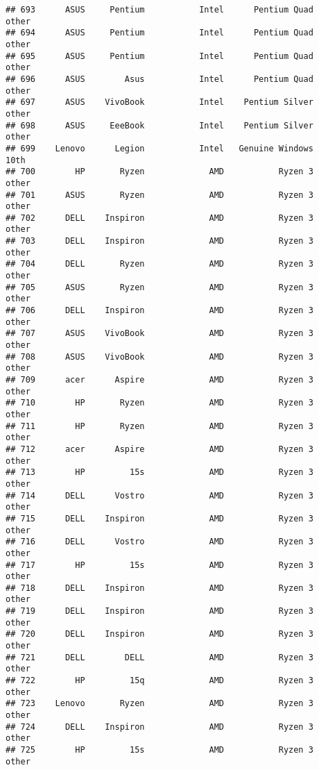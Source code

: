 \documentclass[
]{article}
\begin{document}
\begin{verbatim}
## 693      ASUS     Pentium           Intel      Pentium Quad           other
## 694      ASUS     Pentium           Intel      Pentium Quad           other
## 695      ASUS     Pentium           Intel      Pentium Quad           other
## 696      ASUS        Asus           Intel      Pentium Quad           other
## 697      ASUS    VivoBook           Intel    Pentium Silver           other
## 698      ASUS     EeeBook           Intel    Pentium Silver           other
## 699    Lenovo      Legion           Intel   Genuine Windows            10th
## 700        HP       Ryzen             AMD           Ryzen 3           other
## 701      ASUS       Ryzen             AMD           Ryzen 3           other
## 702      DELL    Inspiron             AMD           Ryzen 3           other
## 703      DELL    Inspiron             AMD           Ryzen 3           other
## 704      DELL       Ryzen             AMD           Ryzen 3           other
## 705      ASUS       Ryzen             AMD           Ryzen 3           other
## 706      DELL    Inspiron             AMD           Ryzen 3           other
## 707      ASUS    VivoBook             AMD           Ryzen 3           other
## 708      ASUS    VivoBook             AMD           Ryzen 3           other
## 709      acer      Aspire             AMD           Ryzen 3           other
## 710        HP       Ryzen             AMD           Ryzen 3           other
## 711        HP       Ryzen             AMD           Ryzen 3           other
## 712      acer      Aspire             AMD           Ryzen 3           other
## 713        HP         15s             AMD           Ryzen 3           other
## 714      DELL      Vostro             AMD           Ryzen 3           other
## 715      DELL    Inspiron             AMD           Ryzen 3           other
## 716      DELL      Vostro             AMD           Ryzen 3           other
## 717        HP         15s             AMD           Ryzen 3           other
## 718      DELL    Inspiron             AMD           Ryzen 3           other
## 719      DELL    Inspiron             AMD           Ryzen 3           other
## 720      DELL    Inspiron             AMD           Ryzen 3           other
## 721      DELL        DELL             AMD           Ryzen 3           other
## 722        HP         15q             AMD           Ryzen 3           other
## 723    Lenovo       Ryzen             AMD           Ryzen 3           other
## 724      DELL    Inspiron             AMD           Ryzen 3           other
## 725        HP         15s             AMD           Ryzen 3           other

\end{verbatim}
\end{document}
